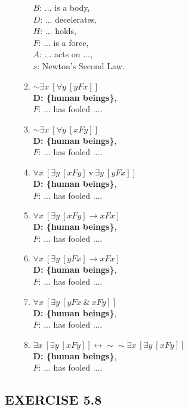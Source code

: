 \documentclass[a4paper,12pt]{article}
\newcommand{\ra}{\rightarrow}
\newcommand{\lra}{\leftrightarrow}
\newcommand{\s}{\sim}
\newcommand{\tv}{ \ \textrm{v} \ }
\newcommand{\ta}{ \ \& \ }
\newcommand{\all}{\forall}
\newcommand{\ex}{\exists}
\begin{document}
\begin{enumerate}[label=\arabic*,leftmargin=*]
\begin{enumerate}[label=(\roman*)]
                    $B$: ... is a body,\\
                    $D$: ... decelerates,\\
                    $H$: ... holds,\\
                    $F$: ... is a force,\\
                    $A$: ... acts on ...,\\
                    $s$: Newton's Second Law.
                \item $\s \ex x \ [\all y \ [yFx]]$\\
                    \textbf{D: \{human beings\}},\\
                    $F$: ... has fooled ....
                \item $\s \ex x \ [\all y \ [xFy]]$\\
                    \textbf{D: \{human beings\}},\\
                    $F$: ... has fooled ....
                \item $\all x \ [\ex y \ [xFy] \tv \ex y \ [yFx]]$\\
                    \textbf{D: \{human beings\}},\\
                    $F$: ... has fooled ....
                \item $\all x \ [\ex y \ [xFy] \ra xFx]$\\
                    \textbf{D: \{human beings\}},\\
                    $F$: ... has fooled ....
                \item $\all x \ [\ex y \ [yFx] \ra xFx]$\\
                    \textbf{D: \{human beings\}},\\
                    $F$: ... has fooled ....
                \item $\all x \ [\ex y \ [yFx \ta xFy]]$\\
                    \textbf{D: \{human beings\}},\\
                    $F$: ... has fooled ....
                \item $\ex x \ [\ex y \ [xFy]] \lra \s \s \ex x \ [\ex y \ [xFy]]$\\
                    \textbf{D: \{human beings\}},\\
                    $F$: ... has fooled ....
            \end{enumerate}
    \end{enumerate}

    \subsection*{EXERCISE 5.8}
\end{document}
